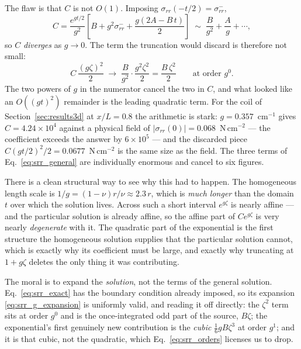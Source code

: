 \documentclass[11pt]{article}
\begin{document}
The flaw is that $C$ is not $O(1)$. Imposing
$\sigma_{rr}\left(-t/2\right) = \sigma_{rr}^{-}$,
\begin{equation}\label{eq:C_big}
    \boxed{\;C = \frac{e^{g t/2}}{g^{2}}
      \left[B + g^{2}\sigma_{rr}^{-}
        + \frac{g\left(2A - B\,t\right)}{2}\right]
    \;\sim\; \frac{B}{g^{2}} + \frac{A}{g} + \cdots,\;}
\end{equation}
so $C$ \emph{diverges} as $g \to 0$. The term the truncation would discard is
therefore not small:
\begin{equation}\label{eq:C_discard}
    C\,\frac{\left(g\zeta\right)^{2}}{2}
    \;\longrightarrow\;
    \frac{B}{g^{2}}\cdot\frac{g^{2}\zeta^{2}}{2}
    = \frac{B\,\zeta^{2}}{2}
    \qquad\text{at order } g^{0}.
\end{equation}
The two powers of $g$ in the numerator cancel the two in $C$, and what looked
like an $O\!\left(\left(gt\right)^{2}\right)$ remainder is the leading quadratic
term. For the coil of Section~\ref{sec:results3d} at $x/L = 0.8$ the arithmetic
is stark: $g = 0.357$~cm$^{-1}$ gives $C = 4.24\times10^{4}$ against a physical
field of $\left|\sigma_{rr}(0)\right| = 0.068$~N\,cm$^{-2}$ --- the coefficient
exceeds the answer by $6\times10^{5}$ --- and the discarded piece
$C\left(gt/2\right)^{2}/2 = 0.0677$~N\,cm$^{-2}$ is the same size as the field.
The three terms of Eq.~\eqref{eq:srr_general} are individually enormous and
cancel to six figures.

There is a clean structural way to see why this had to happen. The homogeneous
length scale is $1/g = \left(1-\nu\right)r/\nu \approx 2.3\,r$, which is
\emph{much longer} than the domain $t$ over which the solution lives. Across such
a short interval $e^{g\zeta}$ is nearly affine --- and the particular solution is
already affine, so the affine part of $C e^{g\zeta}$ is very nearly
\emph{degenerate} with it. The quadratic part of the exponential is the first
structure the homogeneous solution supplies that the particular solution cannot,
which is exactly why its coefficient must be large, and exactly why truncating at
$1 + g\zeta$ deletes the only thing it was contributing.

The moral is to expand the \emph{solution}, not the terms of the general
solution. Eq.~\eqref{eq:srr_exact} has the boundary condition already imposed, so
its expansion \eqref{eq:srr_g_expansion} is uniformly valid, and reading it off
directly: the $\zeta^{2}$ term sits at order $g^{0}$ and is the once-integrated
odd part of the source, $B\zeta$; the exponential's first genuinely new
contribution is the \emph{cubic} $\tfrac16 g B\zeta^{3}$ at order $g^{1}$; and it
is that cubic, not the quadratic, which Eq.~\eqref{eq:srr_orders} licenses us to
drop.
\end{document}
